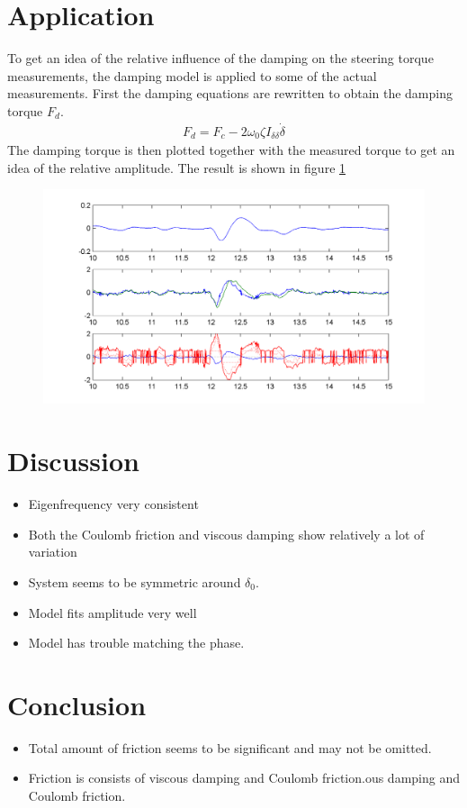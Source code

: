 \section{Application}
To get an idea of the relative influence of the damping on the steering torque measurements, the damping model is applied to some of the actual measurements. First the damping equations are rewritten to obtain the damping torque $F_d$.
		\begin{align}
		F_d =  {F_c}  -  2\omega_0\zeta I_{\delta\delta} \dot{\delta}
		\end{align}
The damping torque is then plotted together with the measured torque to get an idea of the relative amplitude. The result is shown in figure \ref{fig:torque}
		\begin{figure}
			\centering
				\includegraphics{images/torque}
				\caption{}
				\label{fig:torque}
		\end{figure}
\section{Discussion}
\begin{itemize}
\item Eigenfrequency very consistent
\item Both the Coulomb friction and viscous damping show relatively a lot of variation
\item System seems to be symmetric around $\delta_0$. 
\item Model fits amplitude very well
\item Model has trouble matching the phase.
\end{itemize}
\section{Conclusion}
		\begin{itemize}
				\item Total amount of friction seems to be significant and may not be omitted.
				\item Friction is consists of viscous damping and Coulomb friction.ous damping and Coulomb friction.
		\end{itemize}
